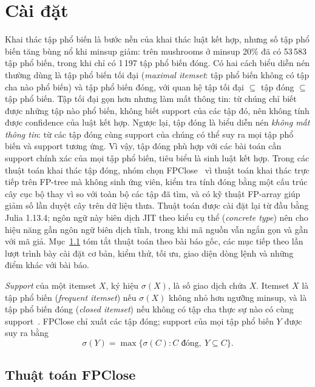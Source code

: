 \section{\texorpdfstring{Cài đặt}{CHƯƠNG 1: CÀI ĐẶT}}
\label{sec:implementation}

Khai thác tập phổ biến là bước nền của khai thác luật kết hợp, nhưng số tập phổ biến tăng bùng nổ khi minsup giảm: trên
mushrooms ở minsup 20\% đã có 53\,583 tập phổ biến, trong khi chỉ có 1\,197 tập phổ biến đóng. Có hai cách biểu diễn nén
thường dùng là tập phổ biến tối đại (\textit{maximal itemset}: tập phổ biến không có tập cha nào phổ biến) và tập phổ
biến đóng, với quan hệ tập tối đại $\subseteq$ tập đóng $\subseteq$ tập phổ biến. Tập tối đại gọn hơn nhưng làm mất
thông tin: từ chúng chỉ biết được những tập nào phổ biến, không biết support của các tập đó, nên không tính được confidence của luật kết hợp. Ngược lại, tập đóng là biểu diễn nén \emph{không mất thông tin}: từ các tập
đóng cùng support của chúng có thể suy ra mọi tập phổ biến và support tương ứng. Vì vậy, tập đóng phù hợp với các bài toán cần support chính xác của mọi tập phổ biến, tiêu biểu là sinh luật kết hợp. Trong các thuật toán khai thác tập đóng,
nhóm chọn FPClose~\cite{grahne2005} vì thuật toán khai thác trực tiếp trên FP-tree mà không sinh ứng viên, kiểm tra tính
đóng bằng một cấu trúc cây cục bộ thay vì so với toàn bộ các tập đã tìm, và có kỹ thuật FP-array giúp giảm số lần duyệt
cây trên dữ liệu thưa. Thuật toán được cài đặt lại từ đầu bằng Julia 1.13.4; ngôn ngữ này biên dịch JIT theo kiểu cụ
thể (\textit{concrete type}) nên cho hiệu năng gần ngôn ngữ biên dịch tĩnh, trong khi mã nguồn vẫn ngắn gọn và gần với
mã giả. Mục~\ref{sec:algorithm} tóm tắt thuật toán theo bài báo gốc, các mục tiếp theo lần lượt trình bày cài đặt cơ
bản, kiểm thử, tối ưu, giao diện dòng lệnh và những điểm khác với bài báo.

\textit{Support} của một itemset $X$, ký hiệu $\sigma(X)$, là số giao dịch chứa $X$. Itemset $X$ là tập phổ biến
(\textit{frequent itemset}) nếu $\sigma(X)$ không nhỏ hơn ngưỡng minsup, và là tập phổ biến đóng (\textit{closed
itemset}) nếu không có tập cha thực sự nào có cùng support~\cite{pasquier1999}. FPClose chỉ xuất các tập đóng; support
của mọi tập phổ biến $Y$ được suy ra bằng
\begin{equation}
  \sigma(Y) = \max\{\sigma(C) : C \text{ đóng},\ Y \subseteq C\}.
  \label{eq:recovery}
\end{equation}

\subsection{Thuật toán FPClose}
\label{sec:algorithm}

